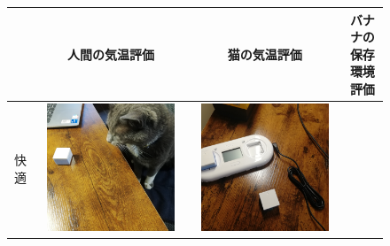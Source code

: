 \documentclass[paper=a4paper,jafontsize=9pt,head_space=15mm,gutter=20mm,
twocolumn,number_of_lines=49, line_length=26zw]{myuarticle}
\begin{document}
\begin{figure}[t]
  \centering
  \label{tab:theme-test}
  \begin{tabular}{|c|c|c|c|}
    \hline
    & \sffamily 人間の気温評価 & \sffamily 猫の気温評価 & \sffamily バナナの保存環境評価 \\
    \hline
    快適 &
    \begin{minipage}[c]{0.15\textwidth}
      \centering
      \includegraphics[width=0.9\textwidth]{resources/cat_before.jpg}
    \end{minipage}    &
    \begin{minipage}[c]{0.15\textwidth}
      \centering
      \includegraphics[width=0.9\textwidth]{resources/doc_before.jpg}

\end{minipage}
\end{tabular}
\end{figure}
\end{document}
